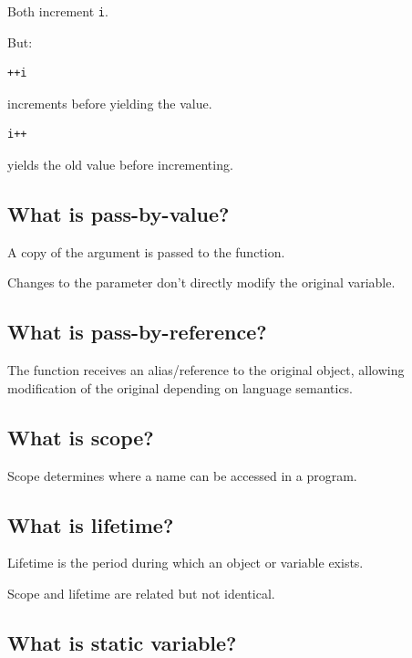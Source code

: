Both increment \texttt{i}.

But:

\begin{lstlisting}
++i
\end{lstlisting}

increments before yielding the value.

\begin{lstlisting}
i++
\end{lstlisting}

yields the old value before incrementing.

\medskip

\subsection{What is pass-by-value?}

A copy of the argument is passed to the function.

Changes to the parameter don't directly modify the original variable.

\medskip

\subsection{What is pass-by-reference?}

The function receives an alias/reference to the original object, allowing modification of the original depending on language semantics.

\medskip

\subsection{What is scope?}

Scope determines where a name can be accessed in a program.

\medskip

\subsection{What is lifetime?}

Lifetime is the period during which an object or variable exists.

Scope and lifetime are related but not identical.

\medskip

\subsection{What is static variable?}

